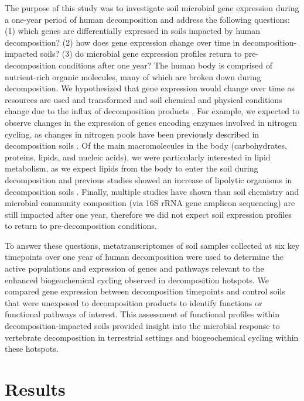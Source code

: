 \documentclass[
  sn-nature,
  lineno, referee]{sn-jnl}
\begin{document}
The purpose of this study was to investigate soil microbial gene
expression during a one-year period of human decomposition and address
the following questions: (1) which genes are differentially expressed in
soils impacted by human decomposition? (2) how does gene expression
change over time in decomposition-impacted soils? (3) do microbial gene
expression profiles return to pre-decomposition conditions after one
year? The human body is comprised of nutrient-rich organic molecules,
many of which are broken down during decomposition. We hypothesized that
gene expression would change over time as resources are used and
transformed and soil chemical and physical conditions change due to the
influx of decomposition products
\citep{keenan_mortality_2018, fancher_evaluation_2017, debruyn_comparative_2021}.
For example, we expected to observe changes in the expression of genes
encoding enzymes involved in nitrogen cycling, as changes in nitrogen
pools have been previously described in decomposition soils
\citep{keenan_mortality_2018}. Of the main macromolecules in the body
(carbohydrates, proteins, lipids, and nucleic acids), we were
particularly interested in lipid metabolism, as we expect lipids from
the body to enter the soil during decomposition and previous studies
showed an increase of lipolytic organisms in decomposition soils
\citep{howard_characterization_2010, mason_body_2022}. Finally, multiple
studies have shown than soil chemistry
\citep{macdonald_carrion_2014, keenan_mortality_2018} and microbial
community composition
\citep{cobaugh_functional_2015, singh_temporal_2018} (via 16S rRNA gene
amplicon sequencing) are still impacted after one year, therefore we did
not expect soil expression profiles to return to pre-decomposition
conditions.

To answer these questions, metatranscriptomes of soil samples collected
at six key timepoints over one year of human decomposition were used to
determine the active populations and expression of genes and pathways
relevant to the enhanced biogeochemical cycling observed in
decomposition hotspots. We compared gene expression between
decomposition timepoints and control soils that were unexposed to
decomposition products to identify functions or functional pathways of
interest. This assessment of functional profiles within
decomposition-impacted soils provided insight into the microbial
response to vertebrate decomposition in terrestrial settings and
biogeochemical cycling within these hotspots.

\section{Results}\label{results}
\end{document}
